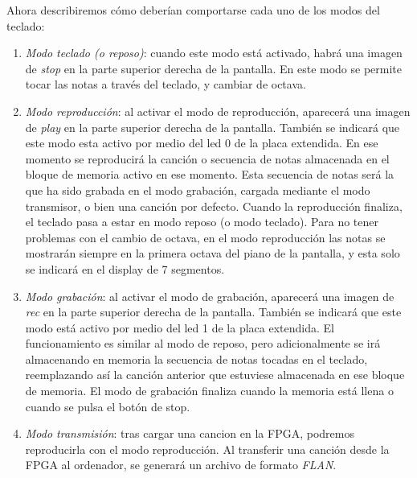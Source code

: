 \documentclass{article}
\begin{document}
	Ahora describiremos cómo deberían comportarse cada uno de los modos del teclado: \\
	\begin{enumerate}
	\item {\itshape Modo teclado (o reposo)}: cuando este modo está activado, habrá una imagen de {\itshape stop} en la parte superior derecha de la pantalla. En este modo se permite tocar las notas a través del teclado, y cambiar de octava.

	\item {\itshape Modo reproducción}: al activar el modo de reproducción, aparecerá una imagen de {\itshape play} en la parte superior derecha de la pantalla. También se indicará que este modo esta activo por medio del led 0 de la placa extendida. En ese momento se reproducirá la canción o secuencia de notas almacenada en el bloque de memoria activo en ese momento. Esta secuencia de notas será la que ha sido grabada en el modo grabación, cargada mediante el modo transmisor, o bien una canción por defecto. Cuando la reproducción finaliza, el teclado pasa a estar en modo reposo (o modo teclado).  Para no tener problemas con el cambio de octava, en el modo reproducción las notas se mostrarán siempre en la primera octava del piano de la pantalla, y esta solo se indicará en el display de 7 segmentos.

	\item {\itshape Modo grabación}: al activar el modo de grabación, aparecerá una imagen de {\itshape rec} en la parte superior derecha de la pantalla. También se indicará que este modo está activo por medio del led 1 de la placa extendida. El funcionamiento es similar al modo de reposo, pero adicionalmente se irá almacenando en memoria la secuencia de notas tocadas en el teclado, reemplazando así la canción anterior que estuviese almacenada en ese bloque de memoria. El modo de grabación finaliza cuando la memoria está llena o cuando se pulsa el botón de stop.

	\item {\itshape Modo transmisión}: tras cargar una cancion en la FPGA, podremos reproducirla con el modo reproducción. Al transferir una canción desde la FPGA al ordenador, se generará un archivo de formato {\itshape FLAN}.



	\end{enumerate}


	
\end{document}
